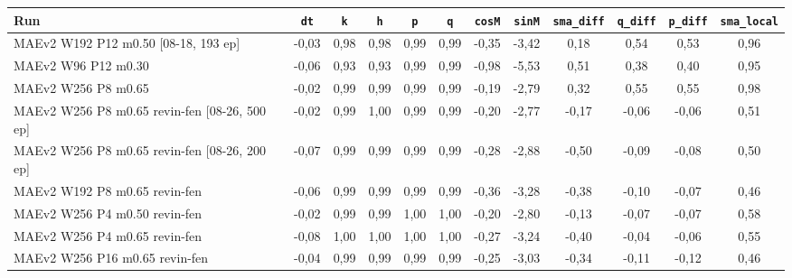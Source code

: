 \begin{tabular}{lccccccccccc}
\toprule
Run & \texttt{dt} & \texttt{k} & \texttt{h} & \texttt{p} & \texttt{q} & \texttt{cosM} & \texttt{sinM} & \texttt{sma\_diff} & \texttt{q\_diff} & \texttt{p\_diff} & \texttt{sma\_local} \\
\midrule
MAEv2 W192 P12 m0.50 [08-18, 193 ep] & -0,03 & 0,98 & 0,98 & 0,99 & 0,99 & -0,35 & -3,42 & 0,18 & 0,54 & 0,53 & 0,96 \\
MAEv2 W96 P12 m0.30 & -0,06 & 0,93 & 0,93 & 0,99 & 0,99 & -0,98 & -5,53 & 0,51 & 0,38 & 0,40 & 0,95 \\
MAEv2 W256 P8 m0.65 & -0,02 & 0,99 & 0,99 & 0,99 & 0,99 & -0,19 & -2,79 & 0,32 & 0,55 & 0,55 & 0,98 \\
MAEv2 W256 P8 m0.65 revin-fen [08-26, 500 ep] & -0,02 & 0,99 & 1,00 & 0,99 & 0,99 & -0,20 & -2,77 & -0,17 & -0,06 & -0,06 & 0,51 \\
MAEv2 W256 P8 m0.65 revin-fen [08-26, 200 ep] & -0,07 & 0,99 & 0,99 & 0,99 & 0,99 & -0,28 & -2,88 & -0,50 & -0,09 & -0,08 & 0,50 \\
MAEv2 W192 P8 m0.65 revin-fen & -0,06 & 0,99 & 0,99 & 0,99 & 0,99 & -0,36 & -3,28 & -0,38 & -0,10 & -0,07 & 0,46 \\
MAEv2 W256 P4 m0.50 revin-fen & -0,02 & 0,99 & 0,99 & 1,00 & 1,00 & -0,20 & -2,80 & -0,13 & -0,07 & -0,07 & 0,58 \\
MAEv2 W256 P4 m0.65 revin-fen & -0,08 & 1,00 & 1,00 & 1,00 & 1,00 & -0,27 & -3,24 & -0,40 & -0,04 & -0,06 & 0,55 \\
MAEv2 W256 P16 m0.65 revin-fen & -0,04 & 0,99 & 0,99 & 0,99 & 0,99 & -0,25 & -3,03 & -0,34 & -0,11 & -0,12 & 0,46 \\
\bottomrule
\end{tabular}
